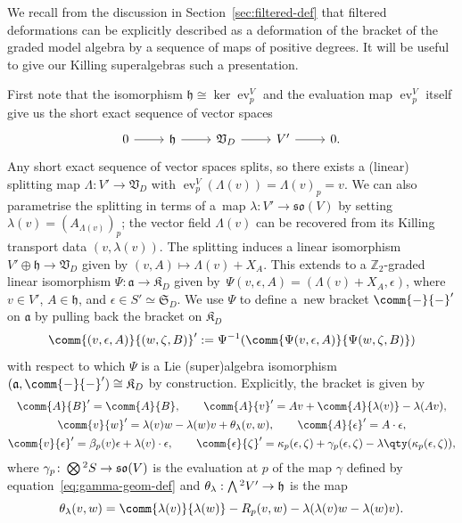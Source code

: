 \documentclass[10pt,a4paper]{amsart}
\numberwithin{equation}{section}
\newcommand{\fa}{\mathfrak{a}}
\newcommand{\fh}{\mathfrak{h}}
\newcommand{\fso}{\mathfrak{so}}
\newcommand{\fK}{\mathfrak{K}}
\newcommand{\fS}{\mathfrak{S}}
\newcommand{\fV}{\mathfrak{V}}
\newcommand{\ZZ}{\mathbb{Z}}
\newcommand{\Wedge}{\mathchoice{{\textstyle\bigwedge}}{\bigwedge}{\bigwedge}{\bigwedge}}	%
\newcommand{\Otimes}{\mathchoice{{\textstyle\bigotimes}}{\bigotimes}{\bigotimes}{\bigotimes}}
\newcommand{\1}{\mathbbm{1}}
\DeclareMathOperator{\evaluate}{ev}
\begin{document}
We recall from the discussion in Section~\ref{sec:filtered-def} that filtered deformations can be explicitly described as a deformation of the bracket of the graded model algebra by a sequence of maps of positive degrees. It will be useful to give our Killing superalgebras such a presentation.

First note that the isomorphism $\fh\cong\ker\evaluate^V_p$ and the evaluation map $\evaluate^V_p$ itself give us the short exact sequence of vector spaces
\[
\begin{tikzcd}
	0 \ar[r] & \fh \ar[r] & \fV_D \ar[r] & V' \ar[r] & 0.
\end{tikzcd}
\]
Any short exact sequence of vector spaces splits, so there exists a (linear) splitting map $\Lambda\colon V'\to \fV_D$ with $\evaluate^V_p(\Lambda(v))=\Lambda(v)_p=v$. We can also parametrise the splitting in terms of a~map $\lambda\colon V'\to \fso(V)$ by setting $\lambda(v)=(A_{\Lambda(v)})_p$; the vector field $\Lambda(v)$ can be recovered from its Killing transport data $(v,\lambda(v))$. The splitting induces a linear isomorphism $V'\oplus\fh\to\fV_D$ given by $(v,A)\mapsto \Lambda(v)+X_A$.
This extends to a $\ZZ_2$-graded linear isomorphism $\Psi\colon \fa \to \fK_D$ given by~${\Psi(v,\epsilon,A) = (\Lambda(v)+X_A,\epsilon)}$,
where $v\in V'$, $A\in\fh$, and $\epsilon\in S'\simeq\fS_D$.
We use $\Psi$ to define a~new bracket $\comm{-}{-}'$ on $\fa$ by pulling back the bracket on $\fK_D$
\[
	\comm{(v,\epsilon,A)}{(w,\zeta,B)}'
		:= \Psi^{-1}(\comm{\Psi(v,\epsilon,A)}{\Psi(w,\zeta,B)})
\]
with respect to which $\Psi$ is a Lie (super)algebra isomorphism $(\fa,\comm{-}{-}')\cong\fK_D$ by construction. Explicitly, the bracket is given by
\begin{gather}
	\comm{A}{B}' = \comm{A}{B},\qquad
	 \comm{A}{v}' = Av + \comm{A}{\lambda(v)}-\lambda(Av),\nonumber	\\
	\comm{v}{w}' = \lambda(v)w-\lambda(w)v + \theta_\lambda(v,w),\qquad
	\comm{A}{\epsilon}' = A\cdot\epsilon,\nonumber	\\
	 \comm{v}{\epsilon}' = \beta_p(v)\epsilon + \lambda(v)\cdot \epsilon,	\qquad
	\comm{\epsilon}{\zeta}'
		 = \kappa_p(\epsilon,\zeta) + \gamma_p(\epsilon,\zeta)-\lambda\qty(\kappa_p(\epsilon,\zeta)),\label{eq:KSA-deformed-brackets}
\end{gather}
where $\gamma_p\colon\Otimes^2S\to\fso(V)$ is the evaluation at $p$ of the map $\gamma$ defined by equation~\eqref{eq:gamma-geom-def} and $\theta_\lambda:\Wedge^2V'\to \fh$ is the map
\[
	\theta_\lambda(v,w)
		= \comm{\lambda(v)}{\lambda(w)} - R_p(v,w) - \lambda(\lambda(v)w-\lambda(w)v).
\]
\end{document}
